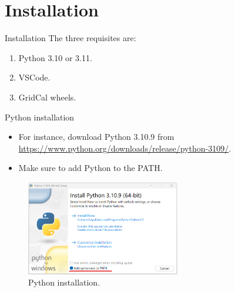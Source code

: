 \section{Installation}

\begin{frame}{}
    \tableofcontents[currentsection]
\end{frame}


\begin{frame}{Installation}
    The three requisites are:
    \begin{enumerate}
        \item Python 3.10 or 3.11.
        \item VSCode.
        \item GridCal wheels.
    \end{enumerate}
\end{frame}

\begin{frame}{Python installation}
    \begin{itemize}
        \item For instance, download Python 3.10.9 from \href{https://www.python.org/downloads/release/python-3109/}{https://www.python.org/downloads/release/python-3109/}.
        \item Make sure to add Python to the PATH.
    \end{itemize}
    \begin{figure}[!htb]
        \centering
        \includegraphics[width=0.6\textwidth]{Images/python_install.png}
        \caption{Python installation.}
        \label{fig:python_installation}
    \end{figure}
\end{frame}

